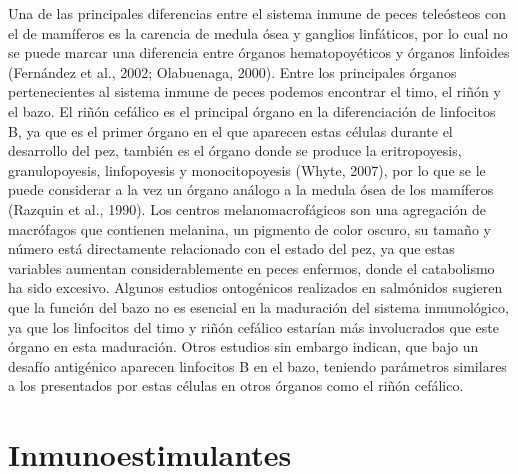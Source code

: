 \documentclass[12pt,a4paper,oneside]{scrbook}
\begin{document}
Una de las principales diferencias entre el sistema inmune de peces
teleósteos con el de mamíferos es la carencia de medula ósea y ganglios
linfáticos, por lo cual no se puede marcar una diferencia entre órganos
hematopoyéticos y órganos linfoides (Fernández et al., 2002; Olabuenaga,
2000)⁠. Entre los principales órganos pertenecientes al sistema inmune
de peces podemos encontrar el timo, el riñón y el bazo. El riñón
cefálico es el principal órgano en la diferenciación de linfocitos B, ya
que es el primer órgano en el que aparecen estas células durante el
desarrollo del pez, también es el órgano donde se produce la
eritropoyesis, granulopoyesis, linfopoyesis y monocitopoyesis (Whyte,
2007), por lo que se le puede considerar a la vez un órgano análogo a la
medula ósea de los mamíferos (Razquin et al., 1990)⁠. Los centros
melanomacrofágicos son una agregación de macrófagos que contienen
melanina, un pigmento de color oscuro, su tamaño y número está
directamente relacionado con el estado del pez, ya que estas variables
aumentan considerablemente en peces enfermos, donde el catabolismo ha
sido excesivo. Algunos estudios ontogénicos realizados en salmónidos
sugieren que la función del bazo no es esencial en la maduración del
sistema inmunológico, ya que los linfocitos del timo y riñón cefálico
estarían más involucrados que este órgano en esta maduración. Otros
estudios sin embargo indican, que bajo un desafío antigénico aparecen
linfocitos B en el bazo, teniendo parámetros similares a los presentados
por estas células en otros órganos como el riñón cefálico.

\section{Inmunoestimulantes}
\end{document}

